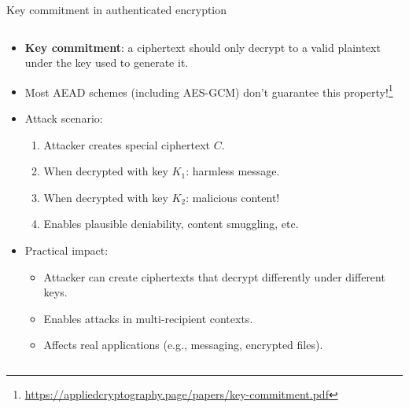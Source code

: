 \documentclass[aspectratio=169, lualatex, handout]{beamer}
\begin{document}
\begin{frame}{Key commitment in authenticated encryption}
	\begin{columns}[c]
		\begin{column}{1\textwidth}
			\begin{itemize}[<+->]
				\item \textbf{Key commitment}: a ciphertext should only decrypt to a valid plaintext under the key used to generate it.
				\item Most AEAD schemes (including AES-GCM) don't guarantee this property!\footnote{\url{https://appliedcryptography.page/papers/key-commitment.pdf}}
				\item Attack scenario:
				      \begin{enumerate}
					      \item Attacker creates special ciphertext $C$.
					      \item When decrypted with key $K_1$: harmless message.
					      \item When decrypted with key $K_2$: malicious content!
					      \item Enables plausible deniability, content smuggling, etc.
				      \end{enumerate}
				\item Practical impact:
				      \begin{itemize}
					      \item Attacker can create ciphertexts that decrypt differently under different keys.
					      \item Enables attacks in multi-recipient contexts.
					      \item Affects real applications (e.g., messaging, encrypted files).
				      \end{itemize}
			\end{itemize}
		\end{column}
	\end{columns}
\end{frame}
\end{document}
